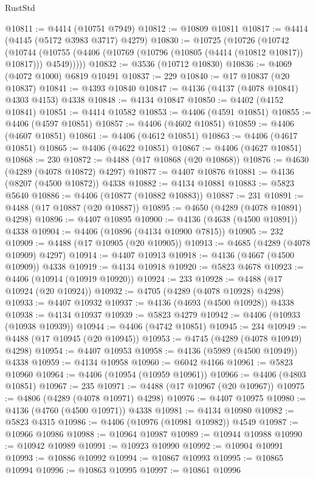\begin{lexlean}{RustStd}
\begin{coremodule}
{\begin{coremodule}
{{{{{{{{{{{{{{{{{{{{{{{{{{{{{{{{{{{{{{{{{{{{{{{{{{@10811 := @4414 (@10751 @7949)
@10812 := @10809 @10811
@10817 := @4414 (@4145 (@5172 @3983 @3717) @4279)
@10830 := @10725
    (@10726
      (@10742
        (@10744 (@10755 (@4406 (@10769 (@10796 (@10805 (@4414 (@10812 @10817)) @10817))) @4549)))))
@10832 := @3536 (@10712 @10830)
@10836 := @4069 (@4072 @1000) @6819 @10491
@10837 := 229
@10840 := @17 @10837 (@20 @10837)
@10841 := @4393 @10840
@10847 := @4136 (@4137 (@4078 @10841) @4303 @4153) @4338
@10848 := @4134 @10847
@10850 := @4402 (@4152 @10841)
@10851 := @4414 @10582
@10853 := @4406 (@4591 @10851)
@10855 := @4406 (@4597 @10851)
@10857 := @4406 (@4602 @10851)
@10859 := @4406 (@4607 @10851)
@10861 := @4406 (@4612 @10851)
@10863 := @4406 (@4617 @10851)
@10865 := @4406 (@4622 @10851)
@10867 := @4406 (@4627 @10851)
@10868 := 230
@10872 := @4488 (@17 @10868 (@20 @10868))
@10876 := @4630 (@4289 (@4078 @10872) @4297)
@10877 := @4407 @10876
@10881 := @4136 (@8207 (@4500 @10872)) @4338
@10882 := @4134 @10881
@10883 := @5823 @5640
@10886 := @4406 (@10877 (@10882 @10883))
@10887 := 231
@10891 := @4488 (@17 @10887 (@20 @10887))
@10895 := @4650 (@4289 (@4078 @10891) @4298)
@10896 := @4407 @10895
@10900 := @4136 (@4638 (@4500 @10891)) @4338
@10904 := @4406 (@10896 (@4134 @10900 @7815))
@10905 := 232
@10909 := @4488 (@17 @10905 (@20 @10905))
@10913 := @4685 (@4289 (@4078 @10909) @4297)
@10914 := @4407 @10913
@10918 := @4136 (@4667 (@4500 @10909)) @4338
@10919 := @4134 @10918
@10920 := @5823 @4678
@10923 := @4406 (@10914 (@10919 @10920))
@10924 := 233
@10928 := @4488 (@17 @10924 (@20 @10924))
@10932 := @4705 (@4289 (@4078 @10928) @4298)
@10933 := @4407 @10932
@10937 := @4136 (@4693 (@4500 @10928)) @4338
@10938 := @4134 @10937
@10939 := @5823 @4279
@10942 := @4406 (@10933 (@10938 @10939))
@10944 := @4406 (@4742 @10851)
@10945 := 234
@10949 := @4488 (@17 @10945 (@20 @10945))
@10953 := @4745 (@4289 (@4078 @10949) @4298)
@10954 := @4407 @10953
@10958 := @4136 (@5989 (@4500 @10949)) @4338
@10959 := @4134 @10958
@10960 := @6042 @4166
@10961 := @5823 @10960
@10964 := @4406 (@10954 (@10959 @10961))
@10966 := @4406 (@4803 @10851)
@10967 := 235
@10971 := @4488 (@17 @10967 (@20 @10967))
@10975 := @4806 (@4289 (@4078 @10971) @4298)
@10976 := @4407 @10975
@10980 := @4136 (@4760 (@4500 @10971)) @4338
@10981 := @4134 @10980
@10982 := @5823 @4315
@10986 := @4406 (@10976 (@10981 @10982)) @4549
@10987 := @10966 @10986
@10988 := @10964 @10987
@10989 := @10944 @10988
@10990 := @10942 @10989
@10991 := @10923 @10990
@10992 := @10904 @10991
@10993 := @10886 @10992
@10994 := @10867 @10993
@10995 := @10865 @10994
@10996 := @10863 @10995
@10997 := @10861 @10996
}}}}}}}}}}}}}}}}}}}}}}}}}}}}}}}}}}}}}}}}}}}}}}}}}}
\end{coremodule}}
\end{coremodule}
\end{lexlean}
